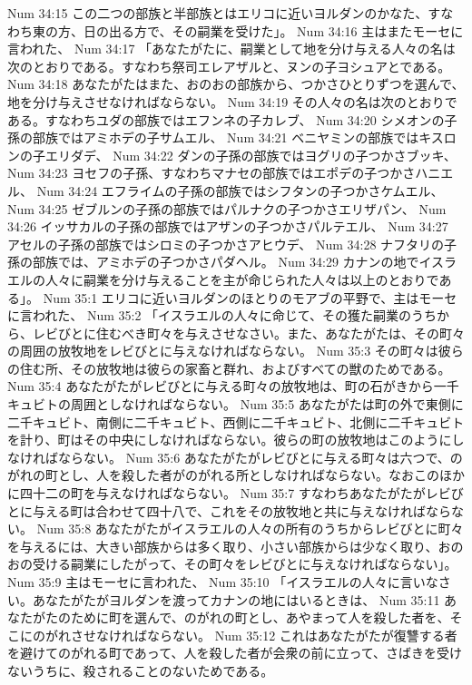 Num 34:15  この二つの部族と半部族とはエリコに近いヨルダンのかなた、すなわち東の方、日の出る方で、その嗣業を受けた」。
Num 34:16  主はまたモーセに言われた、
Num 34:17  「あなたがたに、嗣業として地を分け与える人々の名は次のとおりである。すなわち祭司エレアザルと、ヌンの子ヨシュアとである。
Num 34:18  あなたがたはまた、おのおの部族から、つかさひとりずつを選んで、地を分け与えさせなければならない。
Num 34:19  その人々の名は次のとおりである。すなわちユダの部族ではエフンネの子カレブ、
Num 34:20  シメオンの子孫の部族ではアミホデの子サムエル、
Num 34:21  ベニヤミンの部族ではキスロンの子エリダデ、
Num 34:22  ダンの子孫の部族ではヨグリの子つかさブッキ、
Num 34:23  ヨセフの子孫、すなわちマナセの部族ではエポデの子つかさハニエル、
Num 34:24  エフライムの子孫の部族ではシフタンの子つかさケムエル、
Num 34:25  ゼブルンの子孫の部族ではパルナクの子つかさエリザパン、
Num 34:26  イッサカルの子孫の部族ではアザンの子つかさパルテエル、
Num 34:27  アセルの子孫の部族ではシロミの子つかさアヒウデ、
Num 34:28  ナフタリの子孫の部族では、アミホデの子つかさパダヘル。
Num 34:29  カナンの地でイスラエルの人々に嗣業を分け与えることを主が命じられた人々は以上のとおりである」。
Num 35:1  エリコに近いヨルダンのほとりのモアブの平野で、主はモーセに言われた、
Num 35:2  「イスラエルの人々に命じて、その獲た嗣業のうちから、レビびとに住むべき町々を与えさせなさい。また、あなたがたは、その町々の周囲の放牧地をレビびとに与えなければならない。
Num 35:3  その町々は彼らの住む所、その放牧地は彼らの家畜と群れ、およびすべての獣のためである。
Num 35:4  あなたがたがレビびとに与える町々の放牧地は、町の石がきから一千キュビトの周囲としなければならない。
Num 35:5  あなたがたは町の外で東側に二千キュビト、南側に二千キュビト、西側に二千キュビト、北側に二千キュビトを計り、町はその中央にしなければならない。彼らの町の放牧地はこのようにしなければならない。
Num 35:6  あなたがたがレビびとに与える町々は六つで、のがれの町とし、人を殺した者がのがれる所としなければならない。なおこのほかに四十二の町を与えなければならない。
Num 35:7  すなわちあなたがたがレビびとに与える町は合わせて四十八で、これをその放牧地と共に与えなければならない。
Num 35:8  あなたがたがイスラエルの人々の所有のうちからレビびとに町々を与えるには、大きい部族からは多く取り、小さい部族からは少なく取り、おのおの受ける嗣業にしたがって、その町々をレビびとに与えなければならない」。
Num 35:9  主はモーセに言われた、
Num 35:10  「イスラエルの人々に言いなさい。あなたがたがヨルダンを渡ってカナンの地にはいるときは、
Num 35:11  あなたがたのために町を選んで、のがれの町とし、あやまって人を殺した者を、そこにのがれさせなければならない。
Num 35:12  これはあなたがたが復讐する者を避けてのがれる町であって、人を殺した者が会衆の前に立って、さばきを受けないうちに、殺されることのないためである。
